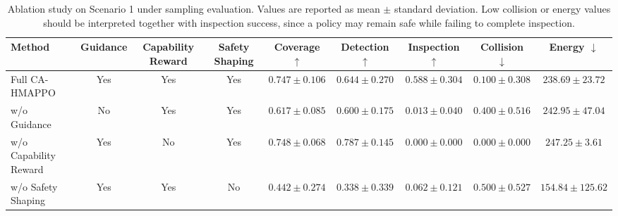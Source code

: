 \begin{table}[t]
\centering
\caption{Ablation study on Scenario 1 under sampling evaluation. Values are reported as mean $\pm$ standard deviation. Low collision or energy values should be interpreted together with inspection success, since a policy may remain safe while failing to complete inspection.}
\label{tab:ablation_scenario_1}
\begin{tabular}{lcccccccc}
\hline
Method & Guidance & Capability Reward & Safety Shaping & Coverage $\uparrow$ & Detection $\uparrow$ & Inspection $\uparrow$ & Collision $\downarrow$ & Energy $\downarrow$ \\
\hline
Full CA-HMAPPO & Yes & Yes & Yes & $0.747 \pm 0.106$ & $0.644 \pm 0.270$ & $0.588 \pm 0.304$ & $0.100 \pm 0.308$ & $238.69 \pm 23.72$ \\
w/o Guidance & No & Yes & Yes & $0.617 \pm 0.085$ & $0.600 \pm 0.175$ & $0.013 \pm 0.040$ & $0.400 \pm 0.516$ & $242.95 \pm 47.04$ \\
w/o Capability Reward & Yes & No & Yes & $0.748 \pm 0.068$ & $0.787 \pm 0.145$ & $0.000 \pm 0.000$ & $0.000 \pm 0.000$ & $247.25 \pm 3.61$ \\
w/o Safety Shaping & Yes & Yes & No & $0.442 \pm 0.274$ & $0.338 \pm 0.339$ & $0.062 \pm 0.121$ & $0.500 \pm 0.527$ & $154.84 \pm 125.62$ \\
\hline
\end{tabular}
\end{table}
